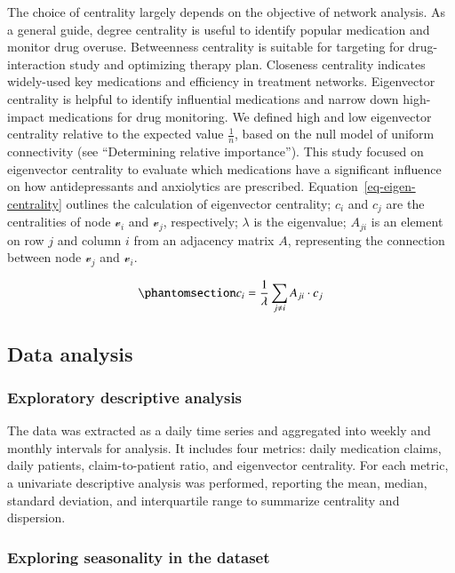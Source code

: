 \documentclass[
  authoryear,
  review]{elsarticle}
\begin{document}
The choice of centrality largely depends on the objective of network
analysis. As a general guide, degree centrality is useful to identify
popular medication and monitor drug overuse. Betweenness centrality is
suitable for targeting for drug-interaction study and optimizing therapy
plan. Closeness centrality indicates widely-used key medications and
efficiency in treatment networks. Eigenvector centrality is helpful to
identify influential medications and narrow down high-impact medications
for drug monitoring. We defined high and low eigenvector centrality
relative to the expected value \(\frac{1}{n}\), based on the null model
of uniform connectivity (see ``Determining relative importance''). This
study focused on eigenvector centrality to evaluate which medications
have a significant influence on how antidepressants and anxiolytics are
prescribed. Equation~\ref{eq-eigen-centrality} outlines the calculation
of eigenvector centrality; \(c_i\) and \(c_j\) are the centralities of
node \(\mathcal{v}_i\) and \(\mathcal{v}_j\), respectively; \(\lambda\)
is the eigenvalue; \(A_{ji}\) is an element on row \(j\) and column
\(i\) from an adjacency matrix \(A\), representing the connection
between node \(\mathcal{v}_j\) and \(\mathcal{v}_i\).

\begin{equation}\phantomsection\label{eq-eigen-centrality}{
\displaystyle c_i = \frac{1}{\lambda} \sum_{j \neq i} A_{ji} \cdot c_j
}\end{equation}

\subsection{Data analysis}\label{data-analysis}

\subsubsection{Exploratory descriptive
analysis}\label{exploratory-descriptive-analysis}

The data was extracted as a daily time series and aggregated into weekly
and monthly intervals for analysis. It includes four metrics: daily
medication claims, daily patients, claim-to-patient ratio, and
eigenvector centrality. For each metric, a univariate descriptive
analysis was performed, reporting the mean, median, standard deviation,
and interquartile range to summarize centrality and dispersion.

\subsubsection{Exploring seasonality in the
dataset}\label{exploring-seasonality-in-the-dataset}
\end{document}

